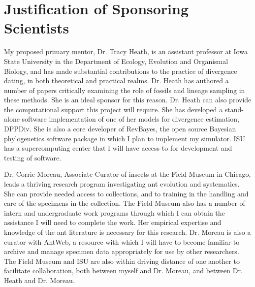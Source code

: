 \documentclass[]{article}
\begin{document}
\section*{Justification of Sponsoring Scientists}
    My proposed primary mentor, Dr. Tracy Heath, is an assistant professor at Iowa State University in the Department of Ecology, Evolution and Organismal Biology, and has made substantial contributions to the practice of divergence dating, in both theoretical and practical realms. Dr. Heath has authored a number of papers critically examining the role of fossils and lineage sampling in these methods. She is an ideal sponsor for this reason. Dr. Heath can also provide the computational support this project will require. She has developed a stand-alone software implementation of one of her models for divergence estimation, DPPDiv. She is also a core developer of RevBayes, the open source Bayesian phylogenetics software package in which I plan to implement my simulator. ISU has a supercomputing center that I will have access to for development and testing of software.  \par
Dr. Corrie Moreau, Associate Curator of insects at the Field Museum in Chicago, leads a thriving research program investigating ant evolution and systematics. She can provide needed access to collections, and to training in the handling and care of the specimens in the collection.  The Field Museum also has a number of intern and undergraduate work programs through which I can obtain the assistance I will need to complete the work. Her empirical expertise and knowledge of the ant literature is necessary for this research.  Dr. Moreau is also a curator with AntWeb, a resource with which I will have to become familiar to archive and manage specimen data appropriately for use by other researchers. The Field Museum and ISU are also within driving distance of one another to facilitate collaboration, both between myself and Dr. Moreau, and between Dr. Heath and Dr. Moreau. \par
\end{document}
